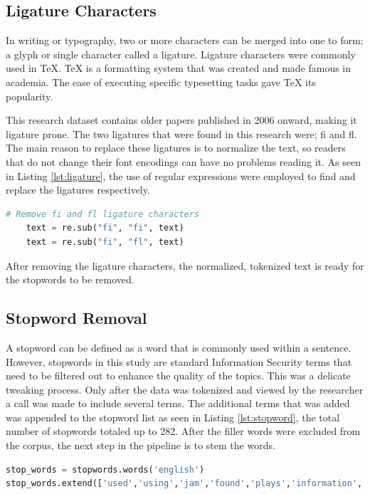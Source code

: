 \subsection{Ligature Characters} \label{ssec:ligature}

In writing or typography, two or more characters can be merged into one to form; a glyph or single character called a ligature. Ligature characters were commonly used in \TeX{}. \TeX{} is a formatting system that was created and made famous in academia. The ease of executing specific typesetting tasks gave \TeX{} its popularity. 

This research dataset contains older papers published in 2006 onward, making it ligature prone. The two ligatures that were found in this research were; fi and fl. The main reason to replace these ligatures is to normalize the text, so readers that do not change their font encodings can have no problems reading it.
As seen in Listing \ref{lst:ligature}, the use of regular expressions were employed to find and replace the ligatures respectively.
\begin{lstlisting}[language=Python, label={lst:ligature}, caption=Replacing Ligature Characters]
    # Remove fi and fl ligature characters
    text = re.sub("fi", "fi", text)
    text = re.sub("fi", "fl", text)
\end{lstlisting}
After removing the ligature characters, the normalized, tokenized text is ready for the stopwords to be removed.

\subsection{Stopword Removal}
A stopword can be defined as a word that is commonly used within a sentence. However, stopwords in this study are standard Information Security terms that need to be filtered out to enhance the quality of the topics. This was a delicate tweaking process. Only after the data was tokenized and viewed by the researcher a call was made to include several terms. The additional terms that was added was appended to the stopword list as seen in Listing \ref{lst:stopword}, the total number of stopwords totaled up to 282. After the filler words were excluded from the corpus, the next step in the pipeline is to stem the words.
\begin{lstlisting}[language=Python,label={lst:stopword}, caption=stopwords code]
stop_words = stopwords.words('english')
stop_words.extend(['used','using','jam','found','plays','information','security','network', 'technology', 'bgp'])
\end{lstlisting}

